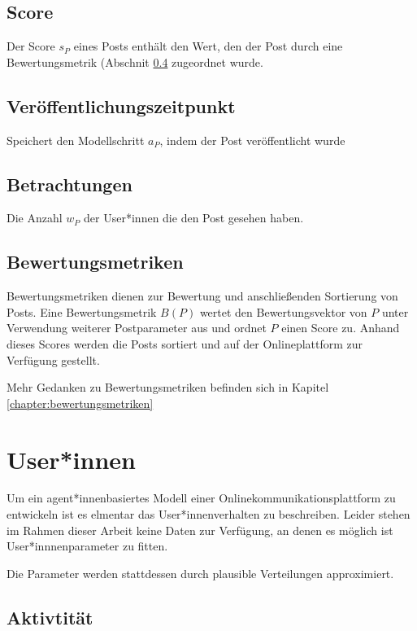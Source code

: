 \subsection{Score}

Der Score $s_P$ eines Posts enthält den Wert, den der Post durch eine Bewertungsmetrik (Abschnit \ref{sec:bewertungsmetrik} zugeordnet wurde.

\subsection{Veröffentlichungszeitpunkt}

Speichert den Modellschritt $a_P$, indem der Post veröffentlicht wurde

\subsection{Betrachtungen}

Die Anzahl $w_P$ der User*innen  die den Post gesehen haben.

\subsection{Bewertungsmetriken}
\label{sec:bewertungsmetrik}

Bewertungsmetriken dienen zur Bewertung und anschließenden Sortierung von Posts. Eine Bewertungsmetrik $B(P)$ wertet den Bewertungsvektor von $P$ unter Verwendung weiterer Postparameter aus und ordnet $P$ einen Score zu. Anhand dieses Scores werden die Posts sortiert und auf der Onlineplattform zur Verfügung gestellt. 

Mehr Gedanken zu Bewertungsmetriken befinden sich in Kapitel \ref{chapter:bewertungsmetriken}


\section{User*innen}

Um ein agent*innenbasiertes Modell einer Onlinekommunikationsplattform zu entwickeln ist es elmentar das User*innenverhalten zu beschreiben. Leider stehen im Rahmen dieser Arbeit keine Daten zur Verfügung, an denen es möglich ist User*innnenparameter zu fitten.

Die Parameter werden stattdessen durch plausible Verteilungen approximiert.

\subsection{Aktivtität}


